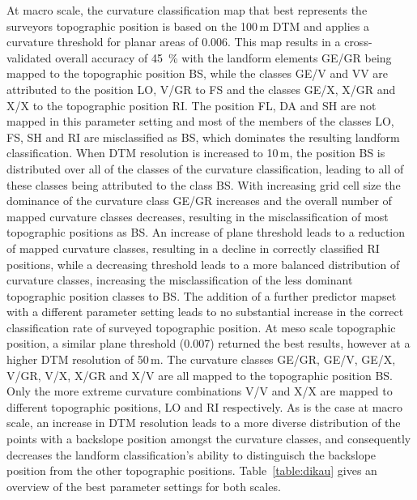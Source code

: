 \documentclass[preprint,12pt,authoryear]{elsarticle}
\begin{document}
 At macro scale, the curvature classification map that best represents the surveyors topographic position is based on the 100\,m DTM and applies a curvature threshold for planar areas of 0.006. This map results in a cross-validated overall accuracy of 45~\% with the landform elements GE/GR being mapped to the topographic position BS, while the classes GE/V and VV are attributed to the position LO, V/GR to FS and the classes GE/X, X/GR and X/X to the topographic position RI. The position FL, DA and SH are not mapped in this parameter setting and most of the members of the classes LO, FS, SH and RI are misclassified as BS, which dominates the resulting landform classification. When DTM resolution is increased to 10\,m, the position BS is distributed over all of the classes of the curvature classification, leading to all of these classes being attributed to the class BS. With increasing grid cell size the dominance of the curvature class GE/GR increases and the overall number of mapped curvature classes decreases, resulting in the misclassification of most topographic positions as BS. An increase of plane threshold leads to a reduction of mapped curvature classes, resulting in a decline in correctly classified RI positions, while a decreasing threshold leads to a more balanced distribution of curvature classes, increasing the misclassification of the less dominant topographic position classes to BS. The addition of a further predictor mapset with a different parameter setting leads to no substantial increase in the correct classification rate of surveyed topographic position.
At meso scale topographic position, a similar plane threshold (0.007) returned the best results, however at a higher DTM resolution of 50\,m. The curvature classes GE/GR, GE/V, GE/X, V/GR, V/X, X/GR and X/V are all mapped to the topographic position BS. Only the more extreme curvature combinations V/V and X/X are mapped to different topographic positions, LO and RI respectively. As is the case at macro scale, an increase in DTM resolution leads to a more diverse distribution of the points with a backslope position amongst the curvature classes, and consequently decreases the landform classification's ability to distinguisch the backslope position from the other topographic positions. Table~\ref{table:dikau} gives an overview of the best parameter settings for both scales.
\end{document}
